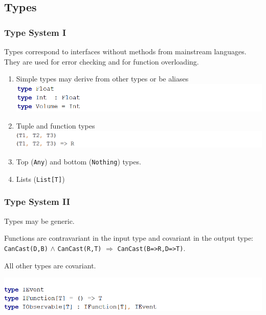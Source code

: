 \documentclass{beamer}
\begin{document}
\subsection{Types}
\begin{frame}
\frametitle{Type System I}
Types correspond to interfaces without methods from mainstream languages. They are used for error checking and for function overloading.
\begin{enumerate}
  \item Simple types may derive from other types or be aliases
  \includegraphics[width=1\linewidth]{intfloat.png}
  \item Tuple and function types
  \includegraphics[width=1\linewidth]{tuplefunction.png}
  \item Top (\texttt{Any}) and bottom (\texttt{Nothing}) types.
  \item Lists (\texttt{List[T]})
\end{enumerate}
\end{frame}
\begin{frame}
\frametitle{Type System II}
Types may be generic. 

Functions are contravariant in the input type and covariant in the output type: \texttt{CanCast(D,B)} $\wedge$ \texttt{CanCast(R,T)} $\Rightarrow$ \texttt{CanCast(B=>R,D=>T)}.

All other types are covariant.

\includegraphics[width=1\linewidth]{iobservable.png}

\end{frame}
\end{document}
